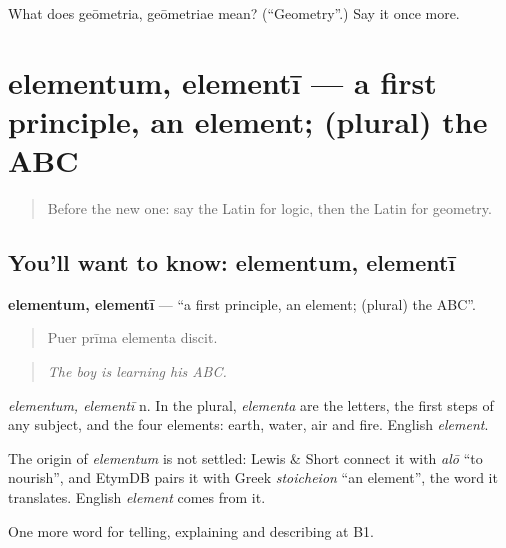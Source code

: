 \begin{tcolorbox}[breakable,colback=teal!4,colframe=teal!35!black,title={Before you move on}]
What does geōmetria, geōmetriae mean? (\textquotedblleft{}Geometry\textquotedblright{}.) Say it once more.
\end{tcolorbox}
\section[elementum, elementī]{elementum, elementī — a first principle, an element; (plural) the ABC}

\label{lesson:LA-C404-elementum}



\begin{quote}
Before the new one: say the Latin for logic, then the Latin for geometry.
\end{quote}

\subsection*{You'll want to know: elementum, elementī}
\textbf{elementum, elementī} — \textquotedblleft{}a first principle, an element; (plural) the ABC\textquotedblright{}.

\begin{quote}
Puer prīma elementa discit.
\end{quote}

\begin{quote}
\emph{The boy is learning his ABC.}
\end{quote}

\emph{elementum, elementī} n. In the plural, \emph{elementa} are the letters, the first steps of any subject, and the four elements: earth, water, air and fire. English \emph{element}.

\begin{cousinweb}
The origin of \emph{elementum} is not settled: Lewis \& Short connect it with \emph{alō} \textquotedblleft{}to nourish\textquotedblright{}, and EtymDB pairs it with Greek \emph{stoicheion} \textquotedblleft{}an element\textquotedblright{}, the word it translates. English \emph{element} comes from it.
\end{cousinweb}

\begin{grammarlens}[title={What you've built}]
One more word for telling, explaining and describing at B1.
\end{grammarlens}

